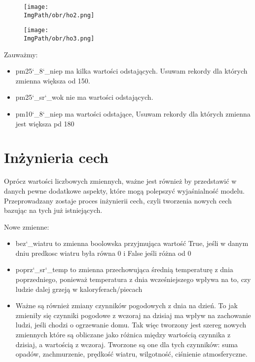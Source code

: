 \documentclass[a4paper,12pt,twoside,openany]{report}
\newcommand{\ImgPath}{.}
\begin{document}
\begin{figure}[H]
	\begin{center}
		\centering
		\texttt{[image: \\ImgPath/obr/ho2.png]}
	\end{center}
	\label{ho2}
\end{figure}

\begin{figure}[H]
	\begin{center}
		\centering
		\texttt{[image: \\ImgPath/obr/ho3.png]}
	\end{center}
	\label{ho3}
\end{figure}

Zauważmy:

\begin{itemize}
	\item pm25\char`_8\char`_niep ma kilka wartości odstających. Usuwam rekordy dla których zmienna większa od 150.
	\item pm25\char`_sr\char`_wok nie ma wartości odstających.
	\item pm10\char`_8\char`_niep ma wartości odstające, Usuwam rekordy dla których zmienna jest większa pd 180
\end{itemize}

\section{Inżynieria cech}

Oprócz wartości liczbowych zmiennych, ważne jest również by przedstawić w danych pewne dodatkowe aspekty, które mogą polepszyć wyjaśnialność modelu. Przeprowadzany zostaje proces inżynierii cech, czyli tworzenia nowych cech bazując na tych już istniejących.

Nowe zmienne:

\begin{itemize}
	\item bez\char`_wiatru to zmienna boolowska przyjmująca wartość True, jeśli w danym dniu predkosc wiatru była równa 0 i False jeśli różna od 0
	\item poprz\char`_sr\char`_temp to zmienna przechowująca średnią temperaturę z dnia poprzedniego, ponieważ temperatura z dnia wcześniejszego wpływa na to, czy ludzie dalej grzeją w kaloryferach/piecach
	\item Ważne są również zmiany czynników pogodowych z dnia na dzień. To jak zmieniły się czynniki pogodowe z wczoraj na dzisiaj ma wpływ na zachowanie ludzi, jeśli chodzi o ogrzewanie domu. Tak więc tworzony jest szereg nowych zmiennych które są obliczane jako różnica między wartością czynnika z dzisiaj, a wartością z wczoraj. Tworzone są one dla tych czynników: suma opadów, zachmurzenie, prędkość wiatru, wilgotność, ciśnienie atmosferyczne.
\end{itemize}
\end{document}

